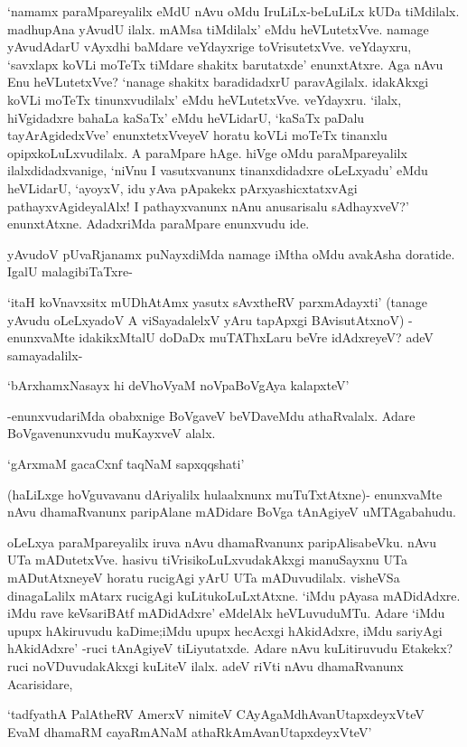`namamx paraMpareyalilx eMdU nAvu oMdu IruLiLx-beLuLiLx kUDa tiMdilalx. madhupAna yAvudU ilalx. mAMsa tiMdilalx' eMdu heVLutetxVve. namage yAvudAdarU vAyxdhi baMdare veYdayxrige toVrisutetxVve. veYdayxru, `savxlapx koVLi moTeTx tiMdare shakitx barutatxde' enunxtAtxre. Aga nAvu Enu heVLutetxVve? `nanage shakitx baradidadxrU paravAgilalx. idakAkxgi koVLi moTeTx tinunxvudilalx' eMdu heVLutetxVve. veYdayxru. `ilalx, hiVgidadxre bahaLa kaSaTx' eMdu heVLidarU, `kaSaTx paDalu tayArAgidedxVve' enunxtetxVveyeV horatu koVLi moTeTx tinanxlu opipxkoLuLxvudilalx. A paraMpare hAge. hiVge oMdu paraMpareyalilx ilalxdidadxvanige, `niVnu I vasutxvanunx tinanxdidadxre oLeLxyadu' eMdu heVLidarU, `ayoyxV, idu yAva pApakekx pArxyashicxtatxvAgi pathayxvAgideyalAlx! I pathayxvanunx nAnu anusarisalu sAdhayxveV?' enunxtAtxne. AdadxriMda paraMpare enunxvudu ide.

yAvudoV pUvaRjanamx puNayxdiMda namage iMtha oMdu avakAsha doratide. IgalU malagibiTaTxre-
 
`itaH koVnavxsitx mUDhAtAmx yasutx sAvxtheRV parxmAdayxti' (tanage yAvudu oLeLxyadoV A viSayadalelxV yAru tapApxgi BAvisutAtxnoV) -enunxvaMte idakikxMtalU doDaDx muTAThxLaru beVre idAdxreyeV? adeV samayadalilx-

\begin{shloka}
`bArxhamxNasayx hi deVhoV\s yaM noVpaBoVgAya kalapxteV'
\end{shloka}

-enunxvudariMda obabxnige BoVgaveV beVDaveMdu athaRvalalx. Adare BoVgavenunxvudu muKayxveV alalx.

\begin{shloka}
`gArxmaM gacaCxnf taqNaM sapxqqshati'
\end{shloka}

(haLiLxge hoVguvavanu dAriyalilx hulaalxnunx muTuTxtAtxne)- enunxvaMte nAvu dhamaRvanunx paripAlane mADidare BoVga tAnAgiyeV uMTAgabahudu.

oLeLxya paraMpareyalilx iruva nAvu dhamaRvanunx paripAlisabeVku. nAvu UTa mADutetxVve. hasivu tiVrisikoLuLxvudakAkxgi manuSayxnu UTa mADutAtxneyeV horatu rucigAgi yArU UTa mADuvudilalx. visheVSa dinagaLalilx mAtarx rucigAgi kuLitukoLuLxtAtxne. `iMdu pAyasa mADidAdxre. iMdu rave keVsariBAtf mADidAdxre' eMdelAlx heVLuvuduMTu. Adare `iMdu upupx hAkiruvudu kaDime;iMdu upupx hecAcxgi hAkidAdxre, iMdu sariyAgi hAkidAdxre' -ruci tAnAgiyeV tiLiyutatxde. Adare nAvu kuLitiruvudu Etakekx? ruci noVDuvudakAkxgi kuLiteV ilalx. adeV riVti nAvu dhamaRvanunx Acarisidare,

\begin{shloka}
`tadfyathA PalAtheRV AmerxV nimiteV CAyAgaMdhAvanUtapxdeyxVteV\\
EvaM dhamaRM cayaRmANaM athaRkAmAvanUtapxdeyxVteV'
\end{shloka} 

